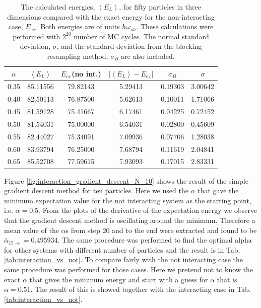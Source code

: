\begin{table}[H]\caption{The calculated energies, $\left<E_L\right>$, for fifty particles in three dimensions compared with the exact energy for the non-interacting case, $E_{ex}$. Both energies are of units $\hbar\omega_{oh}$. These calculations were performed with $2^{20}$ number of MC cycles. The normal standard deviation, $\sigma$, and the standard deviation from the blocking resampling method, $\sigma_B$ are also included.}\label{tab:interaction_N_50}
\center
\begin{tabular}{cccccc}
$\alpha$ & $\left< E_L \right>$ & $E_{ex}$(no int.) & |$\left< E_L \right>-E_{ex}$|  & $\sigma_B$ & $\sigma$\\ \hline
0.35 & 85.11556 & 79.82143 & 5.29413 & 0.19303 & 3.00642\\
0.40 & 82.50113 & 76.87500 & 5.62613 & 0.10011 & 1.71066\\
0.45 & 81.59128 & 75.41667 & 6.17461 & 0.04225 & 0.72452\\
0.50 & 81.54031 & 75.00000 & 6.54031 & 0.02800 & 0.45609\\
0.55 & 82.44027 & 75.34091 & 7.09936 & 0.07706 & 1.28038\\
0.60 & 83.93794 & 76.25000 & 7.68794 & 0.11619 & 2.04841\\
0.65 & 85.52708 & 77.59615 & 7.93093 & 0.17015 & 2.83331\\
\end{tabular}
\end{table} 

Figure \ref{fig:interaction_gradient_descent_N_10} shows the result of the simple gradient descent method for ten particles. Here we used the $\alpha$ that gave the minimum expectation value for the not interacting system as the starting point, i.e. $\alpha = 0.5$. From the plots of the derivative of the expectation energy we observe that the gradient descent method is oscillating around the minimum. Therefore a mean value of the $\alpha$s from step 20 and to the end were extracted and found to be $\bar{\alpha}_{15\rightarrow} = 0.495934$. The same procedure was performed to find the optimal alpha for other systems with different number of particles and the result is in Tab. \ref{tab:interaction_vs_not}. To compare fairly with the not interacting case the same procedure was performed for those cases. Here we pretend not to know the exact $\alpha$ that gives the minimum energy and start with a guess for $\alpha$ that is $\alpha = 0.51$. The result of this is showed together with the interacting case in Tab. \ref{tab:interaction_vs_not}. 

